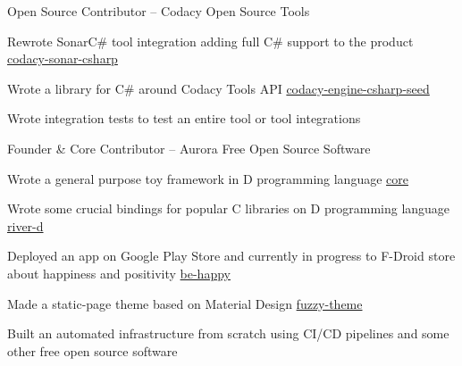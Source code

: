
\begin{cventries}

  \cventry
    {Open Source Contributor -- \href{https://github.com/codacy}{\faGithubSquare\acvHeaderIconSep\@codacy}} %
    {Codacy Open Source Tools} %
    {} %
    {} %
    {
      \begin{cvitems} %
        \item {Rewrote SonarC\# tool integration adding full C\# support to the product \hfill \href{https://github.com/codacy/codacy-sonar-csharp}{codacy-sonar-csharp\acvHeaderIconSep\@\faGithubSquare}}
        \item {Wrote a library for C\# around Codacy Tools API \hfill \href{https://github.com/codacy/codacy-engine-csharp-seed}{codacy-engine-csharp-seed\acvHeaderIconSep\@\faGithubSquare}}
        \item {Wrote integration tests to test an entire tool or tool integrations}
      \end{cvitems}
    }

  \cventry
    {Founder \& Core Contributor --
    \href{https://gitlab.com/aurorafossorg}{\faGitlab\acvHeaderIconSep\@aurorafossorg}} %
    {Aurora Free Open Source Software} %
    {} %
    {} %
    {
      \begin{cvitems} %
        \item {Wrote a general purpose toy framework in D programming language \hfill
        \href{https://gitlab.com/aurorafossorg/p/framework/core}{core\acvHeaderIconSep\@\faGitlab}}
        \item {Wrote some crucial bindings for popular C libraries on D programming language \hfill \href{https://gitlab.com/aurorafossorg/p/riverd}{river-d\acvHeaderIconSep\@\faGitlab}}
        \item{Deployed an app on Google Play Store and currently in progress to F-Droid store about happiness and positivity \hfill \href{https://gitlab.com/aurorafossorg/apps/be-happy}{be-happy\acvHeaderIconSep\@\faGitlab}}
        \item{Made a static-page theme based on Material Design \hfill \href{https://gitlab.com/aurorafossorg/fuzzy-theme}{fuzzy-theme\acvHeaderIconSep\@\faGitlab}}
        \item{Built an automated infrastructure from scratch using CI/CD pipelines and some other free open source software}
      \end{cvitems}
    }


\end{cventries}
